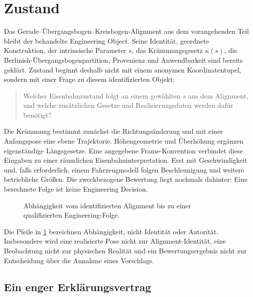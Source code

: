 
\chapter*{Zustand}
{}

Das Gerade--Übergangsbogen--Kreisbogen-Alignment aus dem vorangehenden Teil
bleibt der behandelte Engineering Object. Seine Identität, geordnete
Konstruktion, der intrinsische Parameter \(s\), das Krümmungsgesetz
\(\kappa(s)\), die Berlinish-Übergangsbogenpartition, Provenienz und
Anwendbarkeit sind bereits geklärt. Zustand beginnt deshalb nicht mit einem
anonymen Koordinatentupel, sondern mit einer Frage zu diesem identifizierten
Objekt:

\begin{quote}
Welcher Eisenbahnzustand folgt an einem gewählten \(s\) aus dem Alignment, und
welche zusätzlichen Gesetze und Realisierungsdaten werden dafür benötigt?
\end{quote}

Die Krümmung bestimmt zunächst die Richtungsänderung und mit einer Anfangspose
eine ebene Trajektorie. Höhengeometrie und Überhöhung ergänzen eigenständige
Längsgesetze. Eine angegebene Frame-Konvention verbindet diese Eingaben zu
einer räumlichen Eisenbahninterpretation. Erst mit Geschwindigkeit und, falls
erforderlich, einem Fahrzeugmodell folgen Beschleunigung und weitere
betriebliche Größen. Die zweckbezogene Bewertung liegt nochmals dahinter: Eine
berechnete Folge ist keine Engineering Decision.

\begin{figure}[htbp]
\centering

\caption{Abhängigkeit vom identifizierten Alignment bis zu einer qualifizierten Engineering-Folge.}
\label{fig:railway-state-dependency}
\end{figure}

Die Pfeile in \cref{fig:railway-state-dependency} bezeichnen Abhängigkeit,
nicht Identität oder Autorität. Insbesondere wird eine realisierte Pose nicht
zur Alignment-Identität, eine Beobachtung nicht zur physischen Realität und
ein Bewertungsergebnis nicht zur Entscheidung über die Annahme eines
Vorschlags.

\section*{Ein enger Erklärungsvertrag}

